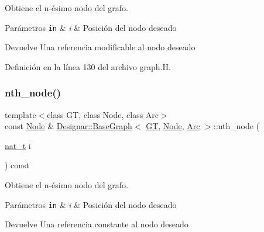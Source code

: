 Obtiene el n-\/ésimo nodo del grafo. 


\begin{DoxyParams}[1]{Parámetros}
\mbox{\tt in}  & {\em i} & Posición del nodo deseado \\
\hline
\end{DoxyParams}
\begin{DoxyReturn}{Devuelve}
Una referencia modificable al nodo deseado 
\end{DoxyReturn}


Definición en la línea 130 del archivo graph.\+H.

\mbox{\label{class_designar_1_1_base_graph_adc03e916cb6246c9eeba181df82fd149}} 
\subsubsection{\texorpdfstring{nth\+\_\+node()}{nth\_node()}\hspace{0.1cm}{\footnotesize\ttfamily [2/2]}}
{\footnotesize\ttfamily template$<$class GT, class Node, class Arc$>$ \\
const \hyperlink{namespace_designar_a5af326c65aa2bd26b26c410f2030d09e}{Node} \& \hyperlink{class_designar_1_1_base_graph}{Designar\+::\+Base\+Graph}$<$ \hyperlink{demo-buildgraph_8_c_a3001c40d2c31ca87ed96cd7d1334a55e}{GT}, \hyperlink{namespace_designar_a5af326c65aa2bd26b26c410f2030d09e}{Node}, \hyperlink{namespace_designar_a3f55fb5513d62ff47cbc8f72b8e95d6f}{Arc} $>$\+::nth\+\_\+node (\begin{DoxyParamCaption}\item[{\hyperlink{namespace_designar_aa72662848b9f4815e7bf31a7cf3e33d1}{nat\+\_\+t}}]{i }\end{DoxyParamCaption}) const\hspace{0.3cm}{\ttfamily [inline]}}



Obtiene el n-\/ésimo nodo del grafo. 


\begin{DoxyParams}[1]{Parámetros}
\mbox{\tt in}  & {\em i} & Posición del nodo deseado \\
\hline
\end{DoxyParams}
\begin{DoxyReturn}{Devuelve}
Una referencia constante al nodo deseado 
\end{DoxyReturn}


